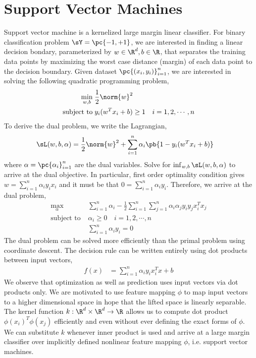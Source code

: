 \documentclass[11pt]{article}
\begin{document}
\section{Support Vector Machines}

Support vector machine is a kernelized large margin linear classifier. For binary classification problem $\sY=\pc{-1,+1}$, we are interested in finding a linear decision bondary, parameterized by $w\in\R^d,b\in\R$, that separates the training data points by maximizing the worst case distance (margin) of each data point to the decision boundary. Given dataset $\pc{(x_i,y_i)}_{i=1}^n$, we are interested in solving the following quadratic programming problem,
\begin{align*}
    \min_{w,b}
        \;& \frac{1}{2} \norm{w}^2 \\
    \text{subject to}
        \;& y_i(w^Tx_i + b) \geq 1 \quad i=1,2,\cdots,n
\end{align*}
To derive the dual problem, we write the Lagrangian, 
\begin{align*}
    \sL(w,b,\alpha)
        &= \frac{1}{2} \norm{w}^2 + \sum_{i=1}^n \alpha_i \pb{ 1 - y_i(w^Tx_i+b) }
\end{align*}
where $\alpha = \pc{\alpha_i}_{i=1}^n$ are the dual variables. Solve for $\inf_{w,b} \sL(w,b,\alpha)$ to arrive at the dual objective. In particular, first order optimality condition gives $w = \sum_{i=1}^n \alpha_i y_i x_i$ and it must be that $0=\sum_{i=1}^n \alpha_i y_i$. Therefore, we arrive at the dual problem, 
\begin{align*}
    \max_{\alpha}
        \;& \sum_{i=1}^n \alpha_i - \frac{1}{2} \sum_{i=1}^n\sum_{j=1}^n \alpha_i \alpha_j y_i y_j x_i^Tx_j \\
    \text{subject to}
        \;& \alpha_i \geq 0 \quad i=1,2,\cdots, n
            \tag{dual feasibility} \\
        & \sum_{i=1}^n \alpha_i y_i = 0 
            \tag{from $\nabla_b \sL = 0$}
\end{align*}
The dual problem can be solved more efficiently than the primal problem using coordinate descent. The decision rule can be written entirely using dot products between input vectors,
\begin{align*}
    f(x)
        &= \sum_{i=1}^n \alpha_i y_i x_i^T x + b
\end{align*}
We observe that optimization as well as prediction uses input vectors via dot products only. We are motivated to use feature mapping $\phi$ to map input vectors to a higher dimensional space in hope that the lifted space is linearly separable. The kernel function $k: \R^d\times\R^d \to \R$ allows us to compute dot product $\phi(x_i)^T\phi(x_j)$ efficiently and even without ever defining the exact forms of $\phi$. We can substitute $k$ whenever inner product is used and arrive at a large margin classifier over implicitly defined nonlinear feature mapping $\phi$, i.e. support vector machines.




\newpage
\printbibliography 
\end{document}
